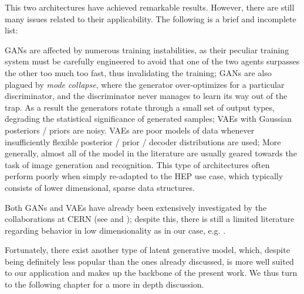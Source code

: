 This two architectures have achieved remarkable results. However, there are still many issues related to their applicability. The following is a brief and incomplete list:

\begin{outline}
    \1 GANs are affected by numerous training instabilities, as their peculiar training system must be carefully engineered to avoid that one of the two agents surpasses the other too much too fast, thus invalidating the training;
    \1 GANs are also plagued by  \emph{mode collapse}, where the generator over-optimizes for a particular discriminator, and the discriminator never manages to learn its way out of the trap. As a result the generators rotate through a small set of output types, degrading the statistical significance of generated samples;
    \1 VAEs with Gaussian posteriors / priors are noisy. VAEs are poor models of data whenever insufficiently flexible posterior / prior / decoder distributions are used;
    \1 More generally, almost all of the model in the literature are usually geared towards the task of image generation and recognition. This type of architectures often perform poorly when simply re-adapted to the HEP use case, which typically consists of lower dimensional, sparse data structures. 
\end{outline}

Both GANs and VAEs have already been extensively investigated by the collaborations at CERN (see \cite{2019glhc} and \cite{otten2021event}); despite this, there is still a limited literature regarding behavior in low dimensionality as in our case, e.g. \cite{523096}.

Fortunately, there exist another type of latent generative model, which, despite being definitely less popular than the ones already discussed, is more well suited to our application and makes up the backbone of the present work. We thus turn to the following chapter for a more in depth discussion.

